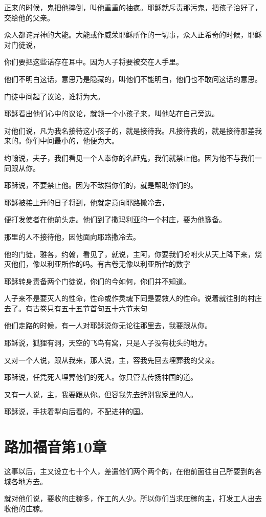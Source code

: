 \documentclass[12pt,oneside]{book}
\begin{document}
正来的时候，鬼把他摔倒，叫他重重的抽疯。耶稣就斥责那污鬼，把孩子治好了，交给他的父亲。

众人都诧异神的大能。大能或作威荣耶稣所作的一切事，众人正希奇的时候，耶稣对门徒说，

你们要把这些话存在耳中。因为人子将要被交在人手里。

他们不明白这话，意思乃是隐藏的，叫他们不能明白，他们也不敢问这话的意思。

门徒中间起了议论，谁将为大。

耶稣看出他们心中的议论，就领一个小孩子来，叫他站在自己旁边。

对他们说，凡为我名接待这小孩子的，就是接待我。凡接待我的，就是接待那差我来的。你们中间最小的，他便为大。

约翰说，夫子，我们看见一个人奉你的名赶鬼，我们就禁止他。因为他不与我们一同跟从你。

耶稣说，不要禁止他。因为不敌挡你们的，就是帮助你们的。

耶稣被接上升的日子将到，他就定意向耶路撒冷去，

便打发使者在他前头走。他们到了撒玛利亚的一个村庄，要为他豫备。

那里的人不接待他，因他面向耶路撒冷去。

他的门徒，雅各，约翰，看见了，就说，主阿，你要我们吩咐火从天上降下来，烧灭他们，像以利亚所作的吗。有古卷无像以利亚所作的数字

耶稣转身责备两个门徒说，你们的今如何，你们并不知道。

人子来不是要灭人的性命，性命或作灵魂下同是要救人的性命。说着就往别的村庄去了。有古卷只有五十五节首句五十六节末句

他们走路的时候，有一人对耶稣说你无论往那里去，我要跟从你。

耶稣说，狐狸有洞，天空的飞鸟有窝，只是人子没有枕头的地方。

又对一个人说，跟从我来，那人说，主，容我先回去埋葬我的父亲。

耶稣说，任凭死人埋葬他们的死人。你只管去传扬神国的道。

又有一人说，主，我要跟从你。但容我先去辞别我家里的人。

耶稣说，手扶着犁向后看的，不配进神的国。

\chapter{路加福音第10章}
这事以后，主又设立七十个人，差遣他们两个两个的，在他前面往自己所要到的各城各地方去。

就对他们说，要收的庄稼多，作工的人少。所以你们当求庄稼的主，打发工人出去收他的庄稼。
\end{document}
